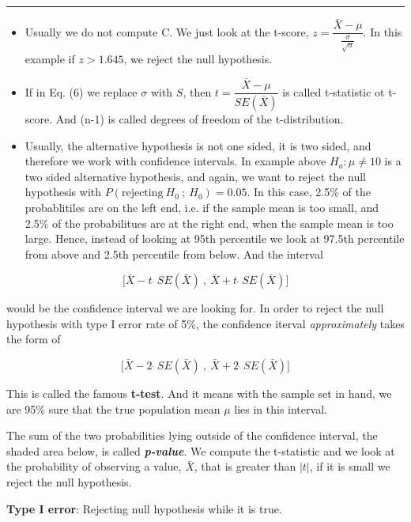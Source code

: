 \documentclass[11pt]{article}
\begin{document}
\begin{center}\rule{0.5\linewidth}{\linethickness}\end{center}

\begin{itemize}
\item
  Usually we do not compute C. We just look at the t-score,
  $z = \dfrac{\bar{X} - \mu}{\frac{\sigma}{\sqrt{n}}}$. In this
  example if $z > 1.645$, we reject the null hypothesis.
\item
  If in Eq. (6) we replace $\sigma$ with $S$, then
  $t = \dfrac{\bar{X} - \mu}{SE(\bar{X})}$ is called t-statistic ot
  t-score. And (n-1) is called degrees of freedom of the t-distribution.
\item
  Usually, the alternative hypothesis is not one sided, it is two sided,
  and therefore we work with confidence intervals. In example above
  $H_a: \mu \ne 10$ is a two sided alternative hypothesis, and again,
  we want to reject the null hypothesis with
  $P(\text{rejecting}\: H_0\: ; \: H_0) = 0.05$. In this case, 2.5\%
  of the probablitiles are on the left end, i.e. if the sample mean is
  too small, and 2.5\% of the probabilitues are at the right end, when
  the sample mean is too large. Hence, instead of looking at 95th
  percentile we look at 97.5th percentile from above and 2.5th
  percentile from below. And the interval
\end{itemize}

\[\big[\bar{X} - t \: \dot{} \:  SE(\bar{X}) \: , \:\bar{X}+ t \:  \dot{} \: SE(\bar{X})\big]\]

would be the confidence interval we are looking for. In order to reject
the null hypothesis with type I error rate of 5\%, the confidence
iterval \emph{approximately} takes the form of

\[\big[\bar{X} - 2 \:\dot{} \:SE(\bar{X}) \: , \: \bar{X}+ 2 \:\dot{} \:SE(\bar{X})\big]\]

This is called the famous \textbf{t-test}. And it means with the sample
set in hand, we are 95\% sure that the true population mean $\mu$ lies
in this interval.

    The sum of the two probabilities lying outside of the confidence
interval, the shaded area below, is called \textbf{\emph{p-value}}. We
compute the t-statistic and we look at the probability of observing a
value, $\bar{X}$, that is greater than $|t|$, if it is small we
reject the null hypothesis.

    \textbf{Type I error}: Rejecting null hypothesis while it is true.
\end{document}

